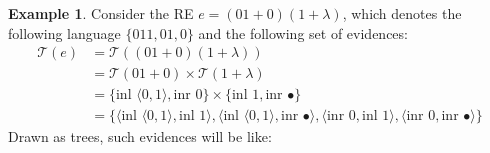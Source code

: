\documentclass[oneside,12pt]{scrbook}
\theoremstyle{definition}
\newtheorem{Example}{Example}
\theoremstyle{plain}
\theoremstyle{definition}
\begin{document}
\begin{Example}\label{example:ambiguoustrees}
   Consider the RE $e = (01 + 0)(1 + \lambda)$, which denotes the following language
   $\{011, 01, 0\}$ and the following set of evidences:
   \begin{align*}
      \mathcal{T}(e) & = \mathcal{T}((01 + 0)(1 + \lambda)) \\
                     & = \mathcal{T}(01 + 0) \times \mathcal{T}(1 + \lambda) \\
                     & = \{\text{inl }\langle 0, 1 \rangle, \text{inr }0\} \times \{\text{inl }1, \text{inr }\bullet\} \\
                     & = \{\langle \text{inl }\langle 0, 1 \rangle, \text{inl }1 \rangle,
                           \langle \text{inl }\langle 0, 1 \rangle, \text{inr }\bullet \rangle,
                           \langle \text{inr }0, \text{inl }1 \rangle,
                           \langle \text{inr }0, \text{inr }\bullet \rangle\}
   \end{align*}
   Drawn as trees, such evidences will be like:


\end{Example}
\end{document}
